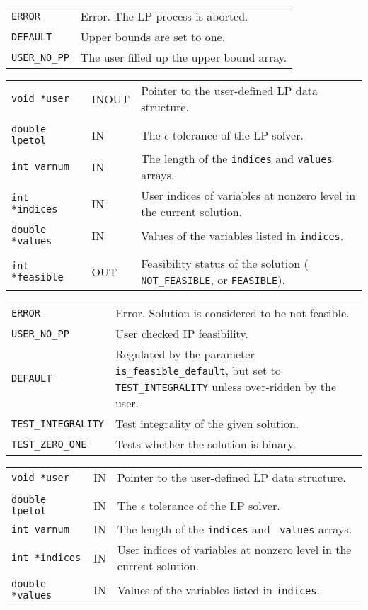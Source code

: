 \documentclass[twoside,11pt]{article}
\begin{document}
{\newpage
\clearpage
\samepage \begin{tabular}{lp{371.195pt}}
{\tt ERROR} & Error. The LP process is aborted. \\  
{\tt DEFAULT} & Upper bounds are set to one. \\  
{\tt USER\_NO\_PP} & The user filled up the upper bound array. \\ 
\end{tabular}
}

{\newpage
\clearpage
\samepage \begin{tabular}{llp{301.645pt}}
{\tt void *user} & INOUT & Pointer to the user-defined LP data structure. \\ 
& & \\ 
{\tt double lpetol} & IN & The $\epsilon$ tolerance of the LP solver. \\ 
{\tt int varnum} & IN & The length of the {\tt indices} and {\tt values}
arrays.\\  
{\tt int *indices} & IN & User indices of variables at nonzero level in the
current solution.\\  
{\tt double *values} & IN & Values of the variables listed in {\tt indices}.\\ 
& & \\ 
{\tt int *feasible} & OUT & Feasibility status of the solution ({\tt
NOT\_FEASIBLE}, or {\tt FEASIBLE}). \\ 
\end{tabular}
}

{\newpage
\clearpage
\samepage \begin{tabular}{lp{338.226pt}}
{\tt ERROR} & Error. Solution is considered to be not feasible.\\ 
{\tt USER\_NO\_PP} & User checked IP feasibility. \\ 
{\tt DEFAULT} & Regulated by the parameter {\tt is\_feasible\_default},
but set to {\tt TEST\_INTEGRALITY} unless over-ridden by the user.\\ 
{\tt TEST\_INTEGRALITY} & Test integrality of the given solution. \\ 
{\tt TEST\_ZERO\_ONE} & Tests whether the solution is binary. \\ 
\end{tabular}
}

{\newpage
\clearpage
\samepage \begin{tabular}{llp{301.645pt}}
{\tt void *user} & IN & Pointer to the user-defined LP data structure. \\ 
& & \\ 
{\tt double lpetol} & IN & The $\epsilon$ tolerance of the LP solver. \\ 
{\tt int varnum} & IN & The length of the {\tt indices} and {\tt
values} arrays.\\ 
{\tt int *indices} & IN & User indices of variables at nonzero level
in the current solution.\\ 
{\tt double *values} & IN & Values of the variables listed in {\tt indices}.\\ 
\end{tabular}
}
\end{document}
